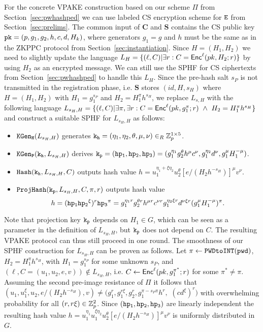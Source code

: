 For the concrete VPAKE construction based on our scheme $\Pi$ from Section~\ref{sec:pwhashped} we can use labeled CS encryption scheme for $\mathtt{E}$ from Section~\ref{sec:prelims}. 
The common input of $\bm{C}$ and $\bm{S}$ contains the CS public key $\mathtt{pk}=(p,g_1,g_2,h,c,d,H_k)$, where generators $g_1=g$ and $h$ must be the same as in the ZKPPC protocol from Section~\ref{sec:instantiation}. 
Since $H=(H_1,H_2)$ we need to slightly update the language $L_H = \{(\ell, C) | \exists r : C = \mathsf{Enc}^\ell(pk, H_2; r)\}$ by using $H_2$ as an encrypted message. 
We can still use the SPHF for CS ciphertexts from Section~\ref{sec:pwhashped} to handle this $L_H$. 
Since the pre-hash salt $s_P$ is not transmitted in the registration phase, i.e. $\bm{S}$ stores $(id, H, s_H)$ where $H=(H_1, H_2)$ with $H_1=g_1^{s_P}$ and $H_2 = H_1^\pi h^{s_H}$, we replace $L_{s,H}$ with the following language $L_{s_H,H} = \{(\ell, C) | \exists \pi, \exists r : C = \Enc^\ell(pk, g_1^\pi; r)\ \wedge\ H_2 = H_1^\pi h^{s_H}\}$ and construct a suitable SPHF for $L_{s_H,H}$ as follows:
\begin{itemize}
	\item $\mathtt{KGen_H}(L_{s_H,H})$ generates $\mathtt{k_h}=(\eta_1,\eta_2,\theta,\mu,\nu)\in_R\mathbb{Z}_p^{1\times 5}$.

	\item $\mathtt{KGen_P}(\mathtt{k_h},L_{s_H,H})$ derives $\mathtt{k_p}=(\mathtt{hp_{1}},\mathtt{hp_{2}},\mathtt{hp_{3}})=(g_1^{\eta_1}g_2^{\theta}h^\mu c^\nu, g_1^{\eta_2}d^\nu, g_1^\mu H_1^{-\mu})$.

	\item $\mathtt{Hash}(\mathtt{k_h},L_{s_H,H},C)$ outputs hash value $h=u_1^{\eta_1+\xi\eta_2}u_2^{\theta}[e/(H_2h^{-s_H})]^\mu v^\nu$.

	\item $\mathtt{ProjHash}(\mathtt{k_p},L_{s_H,H},C,\pi,r)$ outputs hash value \[h=(\mathtt{hp_{1}}\mathtt{hp_{2}}^\xi)^r\mathtt{hp_{3}}^{\pi}=g_1^{\eta_1r}g_2^{\theta r}h^{\mu r} c^{\nu r}g_1^{\eta_2\xi r}d^{\nu\xi r}(g_1^\mu H_1^{-\mu})^{\pi}.\]
\end{itemize}
Note that projection key $\mathtt{k_p}$ depends on $H_1\in G$, which can be seen as a parameter in the definition of $L_{s_H,H}$, but $\mathtt{k_p}$ does not depend on $C$. The resulting VPAKE protocol can thus still proceed in one round. 
The smoothness of our SPHF construction for $L_{s_H,H}$ can be proven as follows. 
Let $\pi\gets\texttt{PWDtoINT}(\mathtt{pwd})$, $H_2 = H_1^\pi h^{s_H}$, with $H_1=g_1^{s_P}$ for some unknown $s_P$, and $(\ell,C=(u_1,u_2,e,v))\not\in L_{s_H,H}$, i.e. $C\gets\mathsf{Enc}^\ell(pk,g_1^{\pi^\ast};r)$ for some $\pi^\ast\not=\pi$. 
Assuming the second pre-image resistance of $\Pi$ it follows that $(u_1, u_1^\xi, u_2, e/(H_2h^{-s_H}), v) \not= (g_1^r, g_1^{r\xi}, g_2^r, g_1^{\pi-s_P\pi}h^r,$ $(cd^\xi)^r)$ with overwhelming probability for all $(r,r\xi)\in\mathbb{Z}_p^2$. 
Since $(\mathtt{hp_{1}},\mathtt{hp_{2}},\mathtt{hp_{3}})$ are linearly independent the resulting hash value $h= u_1^{\eta_1} u_1^{\xi\eta_2} u_2^\theta [e/(H_2h^{-s_H})]^\mu v^\nu$ is uniformly distributed in $G$. 

